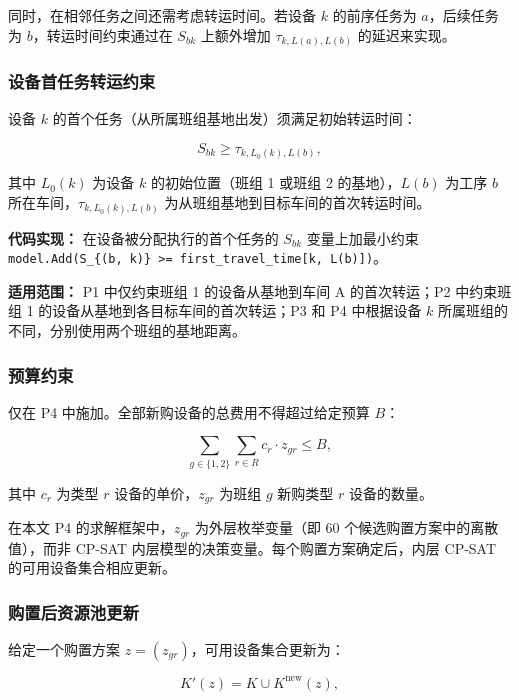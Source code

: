 \documentclass[UTF8,a4paper,12pt]{ctexart}
\begin{document}
同时，在相邻任务之间还需考虑转运时间。若设备 $k$ 的前序任务为 $a$，后续任务为 $b$，转运时间约束通过在 $S_{bk}$ 上额外增加 $\tau_{k, L(a), L(b)}$ 的延迟来实现。

\subsubsection{设备首任务转运约束}
设备 $k$ 的首个任务（从所属班组基地出发）须满足初始转运时间：

\begin{equation}
S_{bk} \geq \tau_{k, L_0(k), L(b)},
\end{equation}

其中 $L_0(k)$ 为设备 $k$ 的初始位置（班组 1 或班组 2 的基地），$L(b)$ 为工序 $b$ 所在车间，$\tau_{k, L_0(k), L(b)}$ 为从班组基地到目标车间的首次转运时间。

\textbf{代码实现：} 在设备被分配执行的首个任务的 $S_{bk}$ 变量上加最小约束 \texttt{model.Add(S\_\{(b, k)\} >= first\_travel\_time[k, L(b)])}。

\textbf{适用范围：} P1 中仅约束班组 1 的设备从基地到车间 A 的首次转运；P2 中约束班组 1 的设备从基地到各目标车间的首次转运；P3 和 P4 中根据设备 $k$ 所属班组的不同，分别使用两个班组的基地距离。

\subsubsection{预算约束}
仅在 P4 中施加。全部新购设备的总费用不得超过给定预算 $B$：

\begin{equation}
\sum_{g \in \{1, 2\}} \sum_{r \in R} c_r \cdot z_{gr} \leq B,
\end{equation}

其中 $c_r$ 为类型 $r$ 设备的单价，$z_{gr}$ 为班组 $g$ 新购类型 $r$ 设备的数量。

在本文 P4 的求解框架中，$z_{gr}$ 为外层枚举变量（即 60 个候选购置方案中的离散值），而非 CP-SAT 内层模型的决策变量。每个购置方案确定后，内层 CP-SAT 的可用设备集合相应更新。

\subsubsection{购置后资源池更新}
给定一个购置方案 $z = (z_{gr})$，可用设备集合更新为：

\begin{equation}
K'(z) = K \cup K^{\text{new}}(z),
\end{equation}
\end{document}
